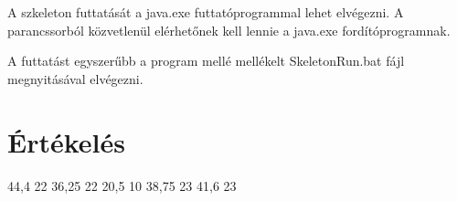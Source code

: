 

A szkeleton futtatását a java.exe futtatóprogrammal lehet elvégezni. A parancssorból közvetlenül elérhetőnek kell lennie a java.exe fordítóprogramnak. 

A futtatást egyszerűbb a program mellé mellékelt SkeletonRun.bat fájl megnyitásával elvégezni.

\section{Értékelés}


\begin{ertekelesplusz}
{44,4} %
{22}        %
{36,25}
{22}
{20,5}
{10}
{38,75}
{23}
{41,6}
{23}

\end{ertekelesplusz}

